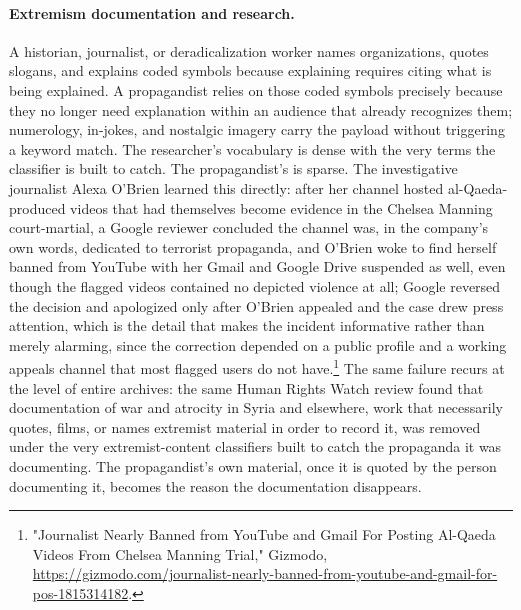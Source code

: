 \documentclass[11pt]{article}
\begin{document}
\paragraph{Extremism documentation and research.} A historian, journalist, or deradicalization worker names organizations, quotes slogans, and explains coded symbols because explaining requires citing what is being explained. A propagandist relies on those coded symbols precisely because they no longer need explanation within an audience that already recognizes them; numerology, in-jokes, and nostalgic imagery carry the payload without triggering a keyword match. The researcher's vocabulary is dense with the very terms the classifier is built to catch. The propagandist's is sparse. The investigative journalist Alexa O'Brien learned this directly: after her channel hosted al-Qaeda-produced videos that had themselves become evidence in the Chelsea Manning court-martial, a Google reviewer concluded the channel was, in the company's own words, dedicated to terrorist propaganda, and O'Brien woke to find herself banned from YouTube with her Gmail and Google Drive suspended as well, even though the flagged videos contained no depicted violence at all; Google reversed the decision and apologized only after O'Brien appealed and the case drew press attention, which is the detail that makes the incident informative rather than merely alarming, since the correction depended on a public profile and a working appeals channel that most flagged users do not have.\footnote{"Journalist Nearly Banned from YouTube and Gmail For Posting Al-Qaeda Videos From Chelsea Manning Trial," Gizmodo, \url{https://gizmodo.com/journalist-nearly-banned-from-youtube-and-gmail-for-pos-1815314182}.} The same failure recurs at the level of entire archives: the same Human Rights Watch review found that documentation of war and atrocity in Syria and elsewhere, work that necessarily quotes, films, or names extremist material in order to record it, was removed under the very extremist-content classifiers built to catch the propaganda it was documenting. The propagandist's own material, once it is quoted by the person documenting it, becomes the reason the documentation disappears.
\end{document}
